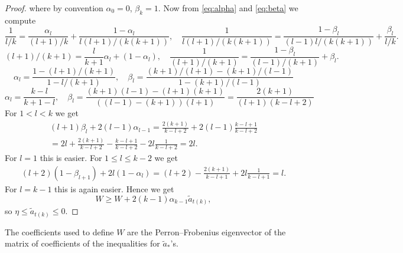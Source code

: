 \begin{proof}
where by convention $\alpha_{0}=0$, $\beta_{k}=1$.
Now from \eqref{eq:alpha} and \eqref{eq:beta} we compute
\[
\frac{1}{l/k}
=
\frac{\alpha_l}{(l+1)/k}+\frac{1-\alpha_l}{l(l+1)/(k(k+1))},
\quad
\frac{1}{l(l+1)/(k(k+1))}
=
\frac{1-\beta_l}{(l-1)l/(k(k+1))}+\frac{\beta_l}{l/k}.
\]
\[
(l+1)/(k+1)
=
\frac{l}{k+1}\alpha_l+(1-\alpha_l),
\quad
\frac{1}{(l+1)/(k+1)}
=
\frac{1-\beta_l}{(l-1)/(k+1)}+\beta_l.
\]
\[
\alpha_{l} = \frac{1-(l+1)/(k+1)}{1-l/(k+1)},
\quad
\beta_{l} = \frac{(k+1)/(l+1)-(k+1)/(l-1)}{1-(k+1)/(l-1)}
\]
\[
\alpha_{l} = \frac{k-l}{k+1-l},
\quad
\beta_{l} = \frac{(k+1)(l-1) - (l+1)(k+1)}{((l-1)-(k+1))(l+1)}
=
\frac{2(k+1)}{(l+1)(k-l+2)}
\]
For $1<l<k$ we get
\begin{multline*}
(l+1)\beta_{l} + 2(l-1)\alpha_{l-1}
=
\frac{2(k+1)}{k-l+2} + 2(l-1)\frac{k-l+1}{k-l+2}
\\ =
2l + \frac{2(k+1)}{k-l+2} -\frac{k-l+1}{k-l+2} - 2l\frac{1}{k-l+2}
=
2l.
\end{multline*}
For $l=1$ this is easier.
For $1\leq l \leq k-2$ we get
\begin{multline*}
(l+2)(1-\beta_{l+1}) + 2l (1-\alpha_{l})
=
(l+2)-\frac{2(k+1)}{k-l+1} + 2l \frac{1}{k-l+1}
=
l.
\end{multline*}
For $l=k-1$ this is again easier.
Hence we get
\[
W \geq W + 2(k-1)\alpha_{k-1} \tilde{a}_{t(k)},
\]
so $\eta \leq \tilde{a}_{t(k)} \leq 0$.
\end{proof}
\begin{remark}
The coefficients used to define $W$ are the Perron--Frobenius eigenvector of the matrix of coefficients of the inequalities for $\tilde{a}_{*}$'s.
\end{remark}
